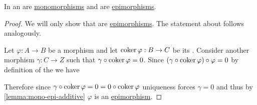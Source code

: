 \documentclass[../main.tex]{subfiles}
\begin{document}
\begin{lemma}
  In an   are \hyperref[def:mono-epi-morphism]{monomorphisms} and  are \hyperref[def:mono-epi-morphism]{epimorphisms}.
\end{lemma}
\begin{proof}
  We will only show that  are \hyperref[def:mono-epi-morphism]{epimorphisms}. The statement about  follows analogously.

  Let \(\varphi: A \to B\) be a morphism and let \(\operatorname*{coker} \varphi: B \to C\) be its .
  Consider another morphism \(\gamma: C \to Z\) such that \(\gamma \circ \operatorname*{coker} \varphi = 0\).
  Since \((\gamma \circ \operatorname*{coker} \varphi) \circ \varphi = 0\) by definition of the  we have
  \begin{center}
  \end{center}
  Therefore since \(\gamma \circ \operatorname*{coker} \varphi = 0 = 0 \circ \operatorname*{coker} \varphi\) uniqueness forces \(\gamma = 0\) and thus by \autoref{lemma:mono-epi-additive} \(\varphi\) is an \hyperref[def:mono-epi-morphism]{epimorphism}.
\end{proof}
\end{document}
